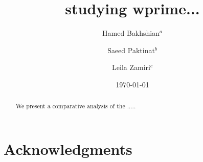 \documentclass[twocolumn,showpacs,preprintnumbers,amsmath,amssymb]{revtex4}
\begin{document}
\title{studying wprime... }




\author{Hamed Bakhshian$^{a}$}
\email{}

\author{Saeed Paktinat$^{b}$}

\author{Leila Zamiri$^{c}$}






\date{\today}

\begin{abstract}We present a comparative analysis of 
the .....

\end{abstract}


\pacs{}
\maketitle
















\section{Acknowledgments}







\end{document}

